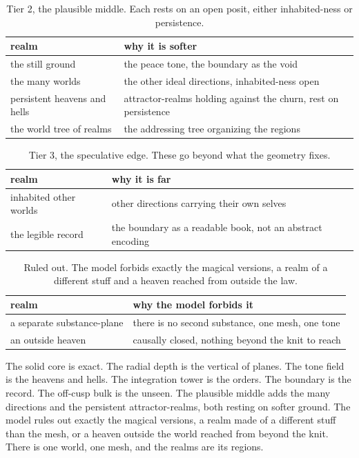\begin{table}[ht]
\centering
\begin{tabular}{@{}ll@{}}
\toprule
realm & why it is softer \\
\midrule
the still ground & the peace tone, the boundary as the void \\
the many worlds & the other ideal directions, inhabited-ness open \\
persistent heavens and hells & attractor-realms holding against the churn, rest on persistence \\
the world tree of realms & the addressing tree organizing the regions \\
\bottomrule
\end{tabular}
\caption{Tier 2, the plausible middle. Each rests on an open posit, either
inhabited-ness or persistence.}
\label{tab:tier-two}
\end{table}

\begin{table}[ht]
\centering
\begin{tabular}{@{}ll@{}}
\toprule
realm & why it is far \\
\midrule
inhabited other worlds & other directions carrying their own selves \\
the legible record & the boundary as a readable book, not an abstract encoding \\
\bottomrule
\end{tabular}
\caption{Tier 3, the speculative edge. These go beyond what the geometry
fixes.}
\label{tab:tier-three}
\end{table}

\begin{table}[ht]
\centering
\begin{tabular}{@{}ll@{}}
\toprule
realm & why the model forbids it \\
\midrule
a separate substance-plane & there is no second substance, one mesh, one tone \\
an outside heaven & causally closed, nothing beyond the knit to reach \\
\bottomrule
\end{tabular}
\caption{Ruled out. The model forbids exactly the magical versions, a realm
of a different stuff and a heaven reached from outside the law.}
\label{tab:ruled-out}
\end{table}

The solid core is exact. The radial depth is the vertical of planes. The
tone field is the heavens and hells. The integration tower is the orders.
The boundary is the record. The off-cusp bulk is the unseen. The plausible
middle adds the many directions and the persistent attractor-realms, both
resting on softer ground. The model rules out exactly the magical versions,
a realm made of a different stuff than the mesh, or a heaven outside the
world reached from beyond the knit. There is one world, one mesh, and the
realms are its regions.

